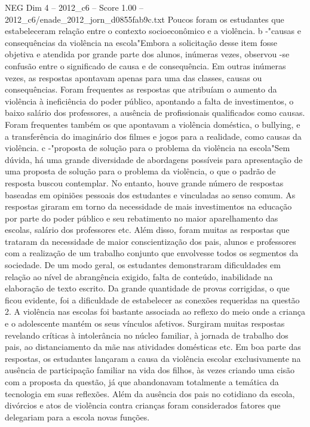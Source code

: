 \begin{textsample}{NEG Dim 4 – 2012\_c6 – Score 1.00 – 2012\_c6/enade\_2012\_jorn\_d0855fab9c.txt}
Poucos foram os estudantes que estabeleceram relação entre o contexto socioeconômico e a violência. b -"causas e consequências da violência na escola"Embora a solicitação desse item fosse objetiva e atendida por grande parte dos alunos, inúmeras vezes, observou -se confusão entre o significado de causa e de consequência.
Em outras inúmeras vezes, as respostas apontavam apenas para uma das classes, causas ou consequências.
Foram frequentes as respostas que atribuíam o aumento da violência à ineficiência do poder público, apontando a falta de investimentos, o baixo salário dos professores, a ausência de profissionais qualificados como causas.
Foram frequentes também os que apontavam a violência doméstica, o bullying, e a transferência do imaginário dos filmes e jogos para a realidade, como causas da violência. c -"proposta de solução para o problema da violência na escola"Sem dúvida, há uma grande diversidade de abordagens possíveis para apresentação de uma proposta de solução para o problema da violência, o que o padrão de resposta buscou contemplar.
No entanto, houve grande número de respostas baseadas em opiniões pessoais dos estudantes e vinculadas ao senso comum.
As respostas giraram em torno da necessidade de mais investimentos na educação por parte do poder público e seu rebatimento no maior aparelhamento das escolas, salário dos professores etc.
Além disso, foram muitas as respostas que trataram da necessidade de maior conscientização dos pais, alunos e professores com a realização de um trabalho conjunto que envolvesse todos os segmentos da sociedade.
De um modo geral, os estudantes demonstraram dificuldades em relação ao nível de abrangência exigido, falta de conteúdo, inabilidade na elaboração de texto escrito.
Da grande quantidade de provas corrigidas, o que ficou evidente, foi a dificuldade de estabelecer as conexões requeridas na questão 2.
A violência nas escolas foi bastante associada ao reflexo do meio onde a criança e o adolescente mantém os seus vínculos afetivos.
Surgiram muitas respostas revelando críticas à intolerância no núcleo familiar, à jornada de trabalho dos pais, ao distanciamento da mãe nas atividades domésticas etc.
Em boa parte das respostas, os estudantes lançaram a causa da violência escolar exclusivamente na ausência de participação familiar na vida dos filhos, às vezes criando uma cisão com a proposta da questão, já que abandonavam totalmente a temática da tecnologia em suas reflexões.
Além da ausência dos pais no cotidiano da escola, divórcios e atos de violência contra crianças foram considerados fatores que delegariam para a escola novas funções.

\end{textsample}
